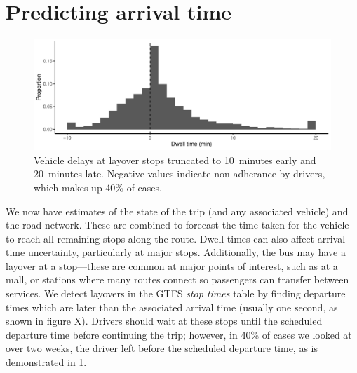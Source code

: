 \section{Predicting arrival time}
\label{sec:prediction_arrival_time}




\begin{knitrout}\small
{}\color{fgcolor}\begin{figure}

{\centering \includegraphics[width=\linewidth]{figure/layover_observance-1} 

}

\caption[Vehicle delays at layover stops truncated to 10~minutes early and 20~minutes late]{Vehicle delays at layover stops truncated to 10~minutes early and 20~minutes late. Negative values indicate non-adherance by drivers, which makes up 40\% of cases.}\label{fig:layover_observance}
\end{figure}


\end{knitrout}

We now have estimates of the state of the trip (and any associated vehicle) and the road network. These are combined to forecast the time taken for the vehicle to reach all remaining stops along the route. Dwell times can also affect arrival time uncertainty, particularly at major stops. Additionally, the bus may have a layover at a stop---these are common at major points of interest, such as at a mall, or stations where many routes connect so passengers can transfer between services. We detect layovers in the GTFS \emph{stop times} table by finding departure times which are later than the associated arrival time (usually one second, as shown in figure X). Drivers should wait at these stops until the scheduled departure time before continuing the trip; however, in 40\% of cases we looked at over two weeks, the driver left before the scheduled departure time, as is demonstrated in \cref{fig:layover_observance}.

